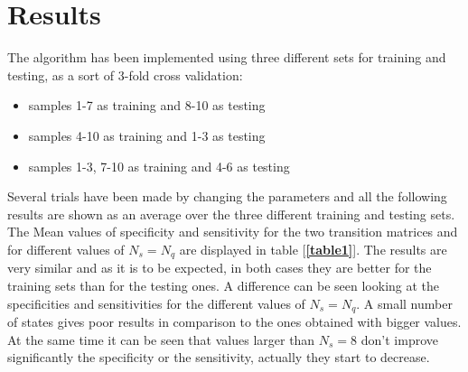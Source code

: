 \documentclass[12pt]{article}
\begin{document}
\section{Results}
The algorithm has been implemented using three different sets for training and testing, as a sort of 3-fold cross validation:
\begin{itemize}[noitemsep]
	\item samples 1-7 as training and 8-10 as testing
	\item samples 4-10 as training and 1-3 as testing
	\item samples 1-3, 7-10 as training and 4-6 as testing
\end{itemize}
Several trials have been made by changing the parameters and all the following results are shown as an average over the three different training and testing sets. The Mean values of specificity and sensitivity for the two transition matrices and for different values of $N_{s} = N_{q}$ are displayed in table [{\textbf{\ref{table1}}}]. The results are very similar and as it is to be expected, in both cases they are better for the training sets than for the testing ones. A difference can be seen looking at the specificities and sensitivities for the different values of $N_{s} = N_{q}$. A small number of states gives poor results in comparison to the ones obtained with bigger values. At the same time it can be seen that values larger than $N_{s} = 8$ don't improve significantly the specificity or the sensitivity, actually they start to decrease.
\end{document}
